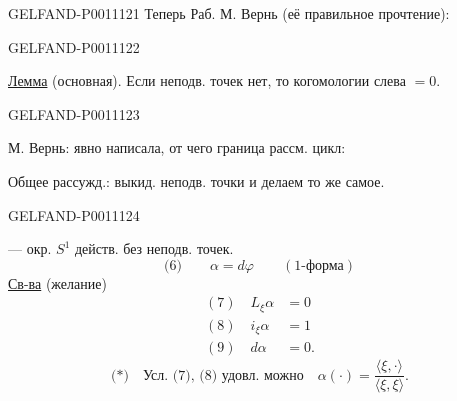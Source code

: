 \begin{GelfandAdjacentEvidence}{GELFAND-P001112}{1}
Теперь Раб. М. Вернь (её правильное прочтение):

\end{GelfandAdjacentEvidence}
\begin{GelfandAdjacentEvidence}{GELFAND-P001112}{2}


\underline{Лемма} (основная). Если неподв. точек нет, то когомологии слева $=0$.
\end{GelfandAdjacentEvidence}
\begin{GelfandAdjacentEvidence}{GELFAND-P001112}{3}


М. Вернь: явно написала, от чего граница рассм. цикл:

Общее рассужд.: выкид. неподв. точки и делаем то же самое.

\end{GelfandAdjacentEvidence}
\begin{GelfandAdjacentEvidence}{GELFAND-P001112}{4}

— окр. $S^1$ действ. без неподв. точек.
\[
\text{(6)}\qquad \alpha=d\varphi\qquad(1\text{-форма})
\]
\underline{Св-ва} (желание)
\[
\begin{aligned}
(7)\quad L_\xi\alpha&=0\\
(8)\quad i_\xi\alpha&=1\\
(9)\quad d\alpha&=0.
\end{aligned}
\]
\[
\text{(*)}\quad \text{Усл. (7), (8) удовл. можно}\quad
\alpha(\cdot)=\frac{\langle\xi,\cdot\rangle}{\langle\xi,\xi\rangle}.
\]

\end{GelfandAdjacentEvidence}
